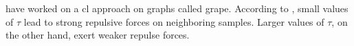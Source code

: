 
\citet{grape_2024} have worked on a \ac{cl} approach on graphs called \ac{grape}.
According to \citeauthor{grape_2024}, small values of $\tau$ lead to strong repulsive forces on neighboring samples.
Larger values of $\tau$, on the other hand, exert weaker repulse forces.